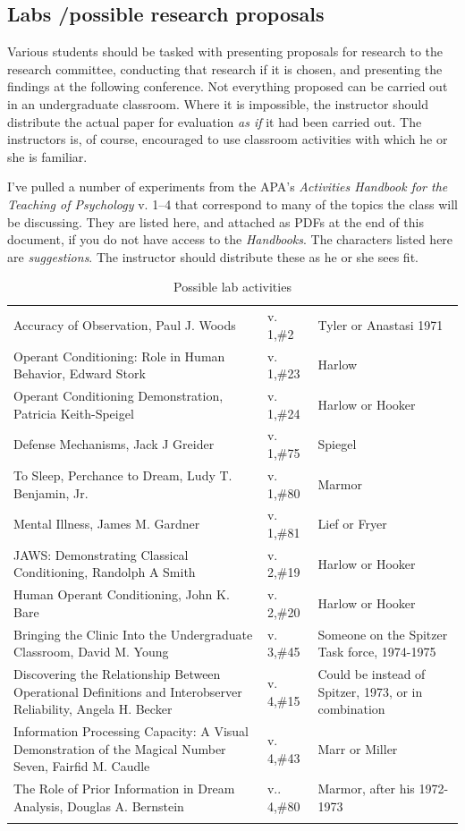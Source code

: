 \subsection{Labs \slash  possible research proposals}
\label{labspossibleresearchproposals}

Various students should be tasked with presenting proposals for research to the research committee, conducting that research if it is chosen, and presenting the findings at the following conference. Not everything proposed can be carried out in an undergraduate classroom. Where it is impossible, the instructor should distribute the actual paper for evaluation \emph{as if} it had been carried out. The instructors is, of course, encouraged to use classroom activities with which he or she is familiar. 

I've pulled a number of experiments from the APA's \emph{Activities Handbook for the Teaching of Psychology} v. 1--4 that correspond to many of the topics the class will be discussing. They are listed here, and attached as PDFs at the end of this document, if you do not have access to the \emph{Handbooks}. The characters listed here are \emph{suggestions}. The instructor should distribute these as he or she sees fit.

 \begin{longtable}[!t]{ | P{7cm} | P{2.5cm} | P{3cm} |}
\hline
{}&&\\ \hline
Accuracy of Observation, Paul J. Woods&v. 1,\#2&Tyler or Anastasi 1971\\
Operant Conditioning: Role in Human Behavior, Edward Stork&v. 1,\#23&Harlow\\
Operant Conditioning Demonstration, Patricia Keith-Speigel&v. 1,\#24&
Harlow or Hooker\\
Defense Mechanisms, Jack J Greider&v. 1,\#75&Spiegel\\
To Sleep, Perchance to Dream, Ludy T. Benjamin, Jr.&v. 1,\#80&Marmor\\
Mental Illness, James M. Gardner&v. 1,\#81&Lief or Fryer\\
JAWS: Demonstrating Classical Conditioning, Randolph A Smith&v. 2,\#19&Harlow or Hooker\\
Human Operant Conditioning, John K. Bare&v. 2,\#20&Harlow or Hooker\\
Bringing the Clinic Into the Undergraduate Classroom, David M. Young&v. 3,\#45&Someone on the Spitzer Task force, 1974-1975\\
Discovering the Relationship Between Operational Definitions and Interobserver Reliability, Angela H. Becker&v. 4,\#15&Could be instead of Spitzer, 1973, or in combination\\
Information Processing Capacity: A Visual Demonstration of the Magical Number Seven, Fairfid M. Caudle&v. 4,\#43&Marr or Miller\\
The Role of Prior Information in Dream Analysis, Douglas A. Bernstein&v.. 4,\#80&Marmor, after his 1972-1973\\ \hline

\caption{Possible lab activities}
\label{table: labs}
\end{longtable}


